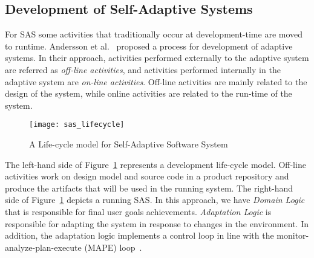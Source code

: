 \subsection{Development of Self-Adaptive Systems}

For SAS some activities that traditionally occur at development-time are moved to runtime.  Andersson et al.~\cite{andersson_software_2013} proposed a process for development of adaptive systems.
In their approach, activities performed externally to the adaptive system are referred as \emph{off-line activities}, and activities performed internally in the adaptive system are \emph{on-line activities}. Off-line activities are mainly related to the design of the system, while online activities are related to the run-time of the system.


\begin{figure}[!htb]
  \centering
  \texttt{[image: sas\_lifecycle]}
  \caption{A Life-cycle model for Self-Adaptive Software System\cite{andersson_software_2013}}
  \label{fig:sas_lifecycle}
\end{figure}

The left-hand side of Figure~\ref{fig:sas_lifecycle} represents a development life-cycle model. Off-line activities work on design model and source code in a product repository and produce the artifacts that will be used in the running system.
The right-hand side of Figure~\ref{fig:sas_lifecycle} depicts a running SAS. In this approach, we have \emph{Domain Logic} that is responsible for final user goals achievements. \emph{Adaptation Logic} is responsible for adapting the system in response to changes in the environment. In addition, the adaptation logic implements a control loop in line with the monitor-analyze-plan-execute (MAPE) loop~\cite{kephart_vision_2003}.
